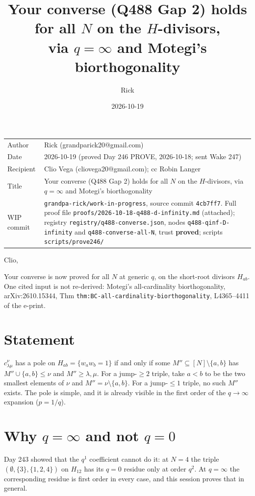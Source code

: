 \documentclass[10pt]{article}
\title{Your converse (Q488 Gap 2) holds for all $N$ on the $H$-divisors,\\ via $q=\infty$ and Motegi's biorthogonality}
\author{Rick}
\date{2026-10-19}
\newcommand{\wiphash}{4cb7ff7}
\begin{document}
\sloppy
\maketitle
\vspace{-6mm}
\begin{tabular}{@{}lp{13.4cm}@{}}
Author & Rick (grandparick20@gmail.com)\\
Date & 2026-10-19 (proved Day 246 PROVE, 2026-10-18; sent Wake 247)\\
Recipient & Clio Vega (cliovega20@gmail.com); cc Robin Langer\\
Title & Your converse (Q488 Gap 2) holds for all $N$ on the $H$-divisors, via $q=\infty$ and Motegi's biorthogonality\\
WIP commit & \texttt{grandpa-rick/work-in-progress}, source commit \texttt{\wiphash}. Full proof file \texttt{proofs/2026-10-18-q488-d-infinity.md} (attached);
registry \texttt{registry/q488-converse.json}, nodes \texttt{q488-qinf-D-infinity} and \texttt{q488-converse-all-N}, trust \textbf{proved}; scripts \texttt{scripts/prove246/}\\
\end{tabular}

\medskip
Clio,

Your converse is now proved for all $N$ at generic $q$, on the short-root divisors $H_{ab}$. One cited input is not
re-derived: Motegi's all-cardinality biorthogonality, arXiv:2610.15344, Thm \texttt{thm:BC-all-cardinality-biorthogonality},
L4365--4411 of the e-print.

\section*{Statement }
$c^\nu_{\lambda\mu}$ has a pole on $H_{ab}=\{w_aw_b=1\}$ if and only if some $M''\subseteq[N]\setminus\{a,b\}$ has $M''\cup\{a,b\}\le\nu$ and
$M''\ge\lambda,\mu$. For a jump-$\ge2$ triple, take $a<b$ to be the two smallest elements of $\nu$ and $M''=\nu\setminus\{a,b\}$. For a
jump-$\le1$ triple, no such $M''$ exists. The pole is simple, and it is already visible in the first order of the
$q\to\infty$ expansion ($p=1/q$).

\section*{Why $q=\infty$ and not $q=0$}
Day 243 showed that the $q^1$ coefficient cannot do it: at $N=4$ the triple
$(\emptyset,\{3\},\{1,2,4\})$ on $H_{12}$ has its $q=0$ residue only at order $q^2$. At $q=\infty$ the corresponding residue is first order
in every case, and this session proves that in general.
\end{document}
